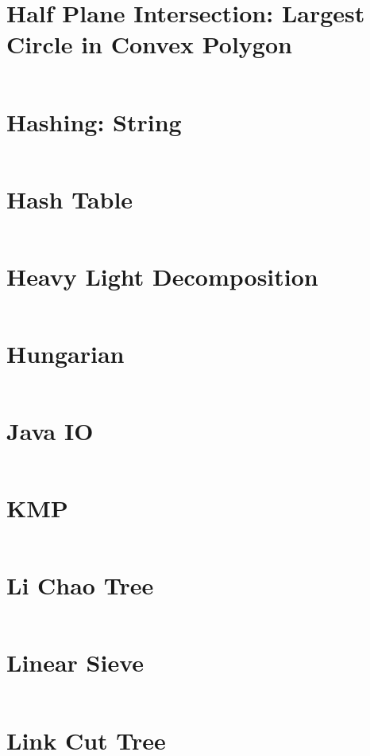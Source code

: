 \documentclass{article}
\begin{document}
\begin{multicols}{3}[
	\maketitle
    \begin{center}
        \rule{\textwidth}{2pt}
    \end{center}
]
\section{Half Plane Intersection: Largest Circle in Convex Polygon}
\inputminted{cpp}{src/HalfPlaneIntersection.cc}

\section{Hashing: String}
\inputminted{cpp}{src/Hash.cc}

\section{Hash Table}
\inputminted{cpp}{src/HashTable.cc}

\section{Heavy Light Decomposition}
\inputminted{cpp}{src/HLD.cpp}

\section{Hungarian}
\inputminted{cpp}{src/Hungarian.cc}

\section{Java IO}
\inputminted{java}{src/JavaIO.java}

\section{KMP}
\inputminted{cpp}{src/KMP.cc}

\section{Li Chao Tree}
\inputminted{cpp}{src/LiChaoTree.cc}

\section{Linear Sieve}
\inputminted{cpp}{src/LinearSieve.cc}

\section{Link Cut Tree}
\inputminted{cpp}{src/LinkCutTree.cpp}


\end{multicols}
\end{document}
